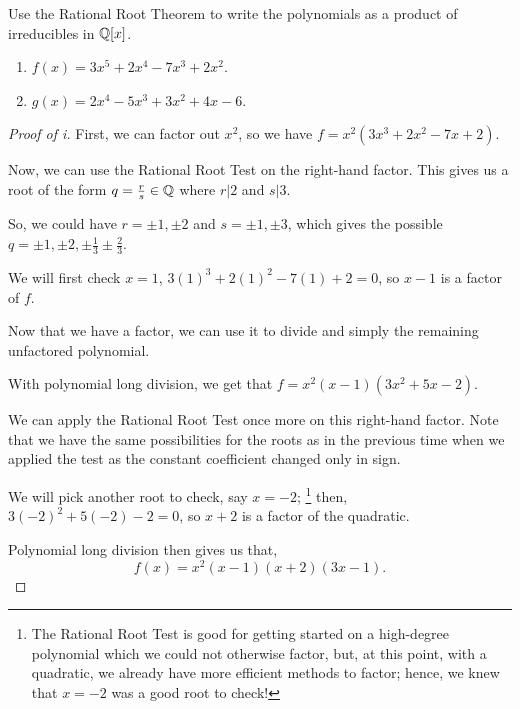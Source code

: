 \documentclass[../hw5]{subfiles}
\begin{document}
\begin{problem}
Use the Rational Root Theorem to write the polynomials as a product of irreducibles in $\mathbb{Q}[x]$.
\begin{enumerate}[label=\roman*)]
	\item $f(x)=3x^5+2x^4-7x^3+2x^2$.
	\item $g(x)=2x^4-5x^3+3x^2+4x-6$.
\end{enumerate}
\end{problem}
\begin{proof}[Proof of i]
	First, we can factor out $x^2$, so we have $f=x^2(3x^3 + 2x^2 - 7x + 2)$.

	Now, we can use the Rational Root Test on the right-hand factor.
	This gives us a root of the form $q=\frac{r}{s} \in \mathbb{Q}$ where $r|2$ and $s|3$.

	So, we could have $r= \pm 1, \pm 2$ and $s= \pm 1, \pm 3$, which gives the possible
	$q= \pm 1, \pm 2, \pm \frac{1}{3} \pm \frac{2}{3}$.

	We will first check $x=1$,  $3(1)^3+2(1)^2-7(1)+2=0$, so $x-1$ is a factor of  $f$.

	Now that we have a factor, we can use it to divide and simply the remaining unfactored polynomial.

	With polynomial long division, we get that $f=x^2(x-1)(3x^2+5x-2)$.

	We can apply the Rational Root Test once more on this right-hand factor.
	Note that we have the same possibilities for the roots as in the previous time when we applied the test as the constant coefficient changed only in sign.

	We will pick another root to check, say $x=-2$;
	\footnote{The Rational Root Test is good for getting started on a high-degree polynomial which we could not otherwise factor, but, at this point, with a quadratic, we already have more efficient methods to factor; hence, we knew that $x=-2$ was a good root to check!}
	then, $3(-2)^2+5(-2)-2=0$, so $x+2$ is a factor of the quadratic.

	Polynomial long division then gives us that, \[
		f(x)=x^2(x-1)(x+2)(3x-1)
		.\]
\end{proof}
\end{document}
